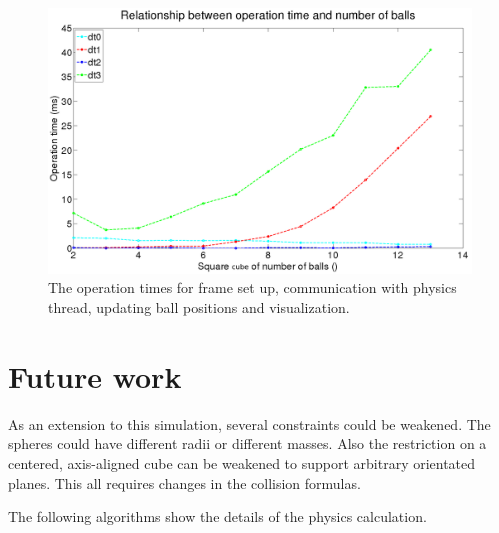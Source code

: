\documentclass[journal, letterpaper]{IEEEtran}
\begin{document}
\begin{figure}[ht!] 
  \centering
  \includegraphics[width=1.0\linewidth]{results.png}
  \caption{The operation times for frame set up, communication with physics thread, updating ball positions and visualization.}
  \label{fig:results}
\end{figure}

\section{Future work}
As an extension to this simulation, several constraints could be weakened. The spheres could have different radii or different masses. Also the restriction on a centered, axis-aligned cube can be weakened to support arbitrary orientated planes. This all requires changes in the collision formulas.

The following algorithms show the details of the physics calculation.
\end{document}
